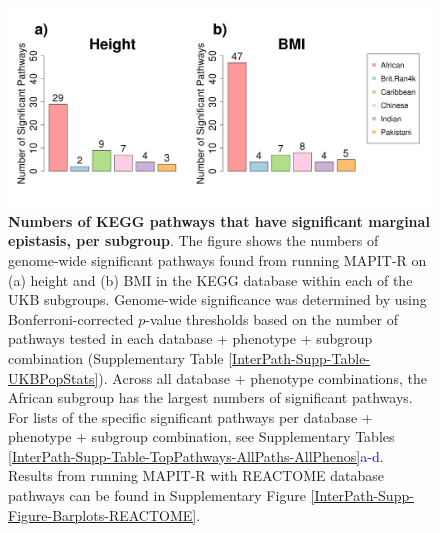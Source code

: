 \documentclass[12pt,a4paper]{article}
\begin{document}
\begin{figure}[htb]
\centering
\hspace*{-.9cm}
\includegraphics[scale=.45]{Images/Main/InterPath_Main_Figure_Barplots_KEGG_vs4.png}
\caption[TBD]{\textbf{Numbers of KEGG pathways that have significant marginal epistasis, per subgroup}. The figure shows the numbers of genome-wide significant pathways found from running MAPIT-R on (a) height and (b) BMI in the KEGG database within each of the UKB subgroups.  Genome-wide significance was determined by using Bonferroni-corrected $p$-value thresholds based on the number of pathways tested in each database + phenotype + subgroup combination (Supplementary Table \ref{InterPath-Supp-Table-UKBPopStats}). Across all database + phenotype combinations, the African subgroup has the largest numbers of significant pathways. For lists of the specific significant pathways per database + phenotype + subgroup combination, see Supplementary Tables \ref{InterPath-Supp-Table-TopPathways-AllPaths-AllPhenos}\textcolor{blue}{a-d}. Results from running MAPIT-R with REACTOME database pathways can be found in Supplementary Figure \ref{InterPath-Supp-Figure-Barplots-REACTOME}.}
\label{InterPath-Main-Figure-Barplots-KEGG}
\end{figure}
\end{document}
